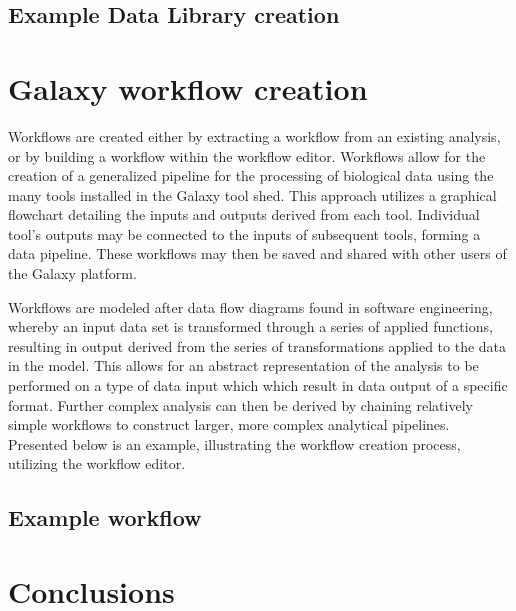 \documentclass[a4paper,10pt]{article}
\begin{document}
\subsection{Example Data Library creation}
\section{Galaxy workflow creation}
Workflows are created either by extracting a workflow from an existing analysis, or by building a workflow within the workflow editor.  Workflows allow for the creation of a generalized pipeline for the processing of biological data using the many tools installed in the Galaxy tool shed.  This approach utilizes a graphical flowchart detailing the inputs and outputs derived from each tool.  Individual tool's outputs may be connected to the inputs of subsequent tools, forming a data pipeline.  These workflows may then be saved and shared with other users of the Galaxy platform.

Workflows are modeled after data flow diagrams found in software engineering, whereby an input data set is transformed through a series of applied functions, resulting in output derived from the series of transformations applied to the data in the model.  This allows for an abstract representation of the analysis to be performed on a type of data input which which result in data output of a specific format.  Further complex analysis can then be derived by chaining relatively simple workflows to construct larger, more complex analytical pipelines.  Presented below is an example, illustrating the workflow creation process, utilizing the workflow editor.
\subsection{Example workflow}
\section{Conclusions}
\end{document}

